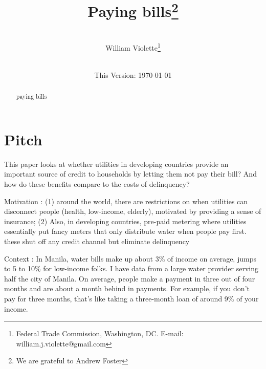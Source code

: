 \documentclass[12pt]{article}
\begin{document}
\begin{titlepage} 
\title{{Paying bills}\thanks{We are grateful to Andrew Foster}}
\author{\\[3em]
  William Violette\thanks{Federal Trade Commission, Washington, DC. E-mail: william.j.violette@gmail.com} \\
 \\ 
  }
\vspace{30mm}
\date{\vspace{5mm}This Version: \today}
\maketitle
\begin{abstract}

	paying bills


\bigskip
\end{abstract}
\setcounter{page}{0}
\thispagestyle{empty}
\end{titlepage}
\pagebreak \newpage



\section{Pitch}

This paper looks at whether utilities in developing countries provide an important source of credit to households by letting them not pay their bill?  And how do these benefits compare to the costs of delinquency?

Motivation : (1) around the world, there are restrictions on when utilities can disconnect people (health, low-income, elderly), motivated by providing a sense of insurance;  (2) Also, in developing countries, pre-paid metering where utilities essentially put fancy meters that only distribute water when people pay first.  these shut off any credit channel but eliminate delinquency

Context : In Manila, water bills make up about 3\% of income on average, jumps to 5 to 10\% for low-income folks.  I have data from a large water provider serving half the city of Manila.  On average, people make a payment in three out of four months and are about a month behind in payments.  For example, if you don't pay for three months, that's like taking a three-month loan of around 9\% of your income.  
\end{document}
